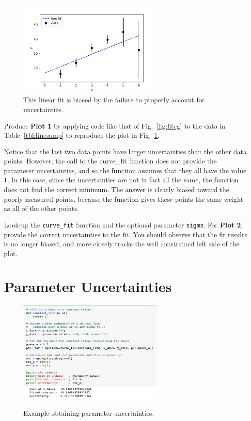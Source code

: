 \begin{figure}[htbp]
\begin{center}
\includegraphics[width=0.65\textwidth]{figs/labs/fitting/bias.pdf} 
\caption{This linear fit is biased by the failure to properly account for uncertainties.}
\label{fig:fitbias}
\end{center}
\end{figure}

Produce {\bf Plot 1} by applying code like that of Fig.~\ref{fig:fiteg}
to the data in Table~\ref{tbl:linesamp} to reproduce the plot in
Fig.~\ref{fig:fitbias}.  

Notice that the last two data points have larger uncertainties than
the other data points.  However, the call to the {curve{\_}fit}
function does not provide the parameter uncertainties, and so the
function assumes that they all have the value $1$.  In this case,
since the uncertainties are not in fact all the same, the function
does not find the correct minimum.  The answer is clearly biased
toward the poorly measured points, because the function gives these
points the same weight as all of the other points.

Look-up the {\tt curve{\_}fit} function and the optional parameter
{\tt sigma}.  For {\bf Plot 2}, provide the correct uncertainties to
the fit.  You should observe that the fit results is no longer biased,
and more closely tracks the well constrained left side of the plot.

\section{Parameter Uncertainties}

\begin{figure}[htbp]
\begin{center}
\includegraphics[width=0.65\textwidth]{figs/labs/fitting/uncertainties.png} \\
\caption{Example obtaining parameter uncertainties.}
\label{fig:fitunc}
\end{center}
\end{figure}

